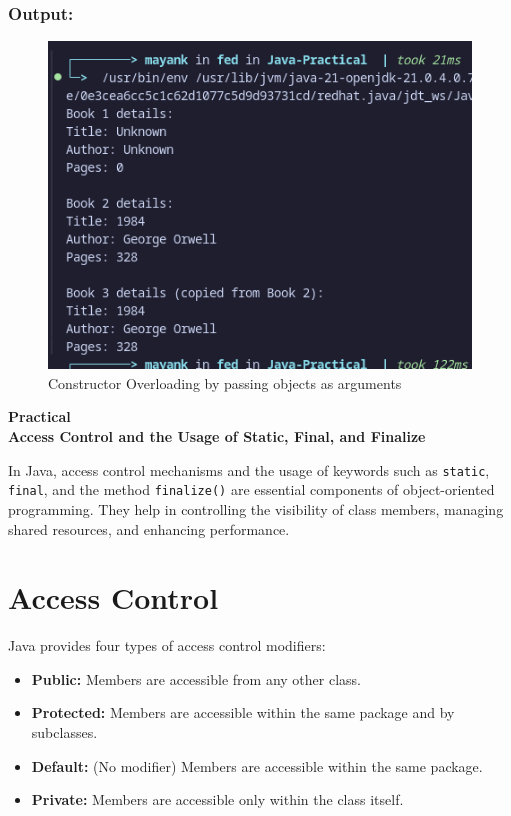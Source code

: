 \documentclass[a4paper,12pt]{article}
\newcounter{practicalno} %
\newcommand{\practicaltitle}[1]{
    \stepcounter{practicalno} %
    \newpage
    \begin{center}
        \vspace{1cm}
        \Large\textbf{Practical \thepracticalno} \\
        \vspace{0.5cm}
        \Large\textbf{#1} %
        \normalsize\vspace{1cm}
    \end{center}
}
\begin{document}
\subsubsection{Output: }
\begin{figure}[H]
    \centering
    \includegraphics[width=0.9\linewidth]{images/COBPAA.png}
    \caption{Constructor Overloading by passing objects as arguments}
    \label{fig:sample_image}
\end{figure}

\setcounter{section}{0}
\practicaltitle{Access Control and the Usage of Static, Final, and Finalize}

In Java, access control mechanisms and the usage of keywords such as \texttt{static}, \texttt{final}, and the method \texttt{finalize()} are essential components of object-oriented programming. They help in controlling the visibility of class members, managing shared resources, and enhancing performance.

\section{Access Control}
Java provides four types of access control modifiers:
\begin{itemize}
  \item \textbf{Public:} Members are accessible from any other class.
  \item \textbf{Protected:} Members are accessible within the same package and by subclasses.
  \item \textbf{Default:} (No modifier) Members are accessible within the same package.
  \item \textbf{Private:} Members are accessible only within the class itself.
\end{itemize}
\end{document}
